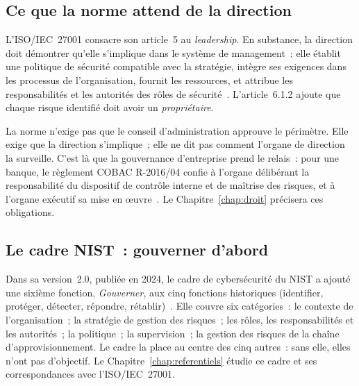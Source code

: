 \subsection{Ce que la norme attend de la direction}

L'ISO/IEC~27001 consacre son article~5 au \emph{leadership}. En substance,
la direction doit démontrer qu'elle s'implique dans le système de
management~: elle établit une politique de sécurité compatible avec la
stratégie, intègre ses exigences dans les processus de l'organisation,
fournit les ressources, et attribue les responsabilités et les autorités
des rôles de sécurité~\cite{iso27001_2022}. L'article~6.1.2 ajoute que
chaque risque identifié doit avoir un \emph{propriétaire}.

La norme n'exige pas que le conseil d'administration approuve le
périmètre. Elle exige que la direction s'implique~; elle ne dit pas
comment l'organe de direction la surveille. C'est là que la gouvernance
d'entreprise prend le relais~: pour une banque, le règlement COBAC
R-2016/04 confie à l'organe délibérant la responsabilité du dispositif de
contrôle interne et de maîtrise des risques, et à l'organe exécutif sa mise
en œuvre~\cite{cobac2016r04}. Le Chapitre~\ref{chap:droit} précisera ces
obligations.

\subsection{Le cadre NIST~: gouverner d'abord}

Dans sa version~2.0, publiée en 2024, le cadre de cybersécurité du NIST a
ajouté une sixième fonction, \emph{Gouverner}, aux cinq fonctions
historiques (identifier, protéger, détecter, répondre,
rétablir)~\cite{nist2024csf}. Elle couvre six catégories~: le contexte de
l'organisation~; la stratégie de gestion des risques~; les rôles, les
responsabilités et les autorités~; la politique~; la supervision~; la
gestion des risques de la chaîne d'approvisionnement. Le cadre la place au
centre des cinq autres~: sans elle, elles n'ont pas d'objectif. Le
Chapitre~\ref{chap:referentiels} étudie ce cadre et ses correspondances
avec l'ISO/IEC~27001.

